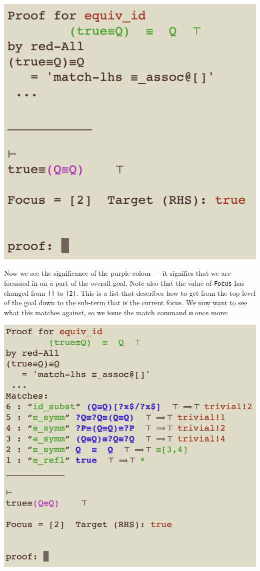\documentclass[11pt]{article}
\begin{document}
\includegraphics[scale=0.75]{doc/images/3-d2.png}


Now we see the significance of the purple colour --- it signifies that we are focussed in on a part of the overall goal.
Note also that the value of \verb"Focus" has changed from \verb"[]" 
to \verb"[2]". This is a list that describes how to get from the top-level
of the goal down to the sub-term that is the current focus.
We now want to see what this matches against,
so we issue the match command \verb"m" once more:

\includegraphics[scale=0.75]{doc/images/4-m.png}
\end{document}
